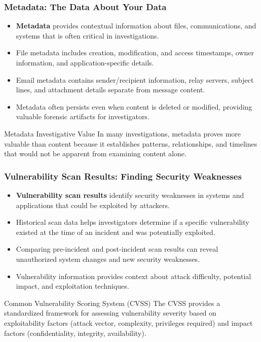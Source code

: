 \documentclass{beamer}
\begin{document}
\begin{frame}
\frametitle{Metadata: The Data About Your Data}
\begin{itemize}
\item \textbf{Metadata} provides contextual information about files, communications, and systems that is often critical in investigations.
\item File metadata includes creation, modification, and access timestamps, owner information, and application-specific details.
\item Email metadata contains sender/recipient information, relay servers, subject lines, and attachment details separate from message content.
\item Metadata often persists even when content is deleted or modified, providing valuable forensic artifacts for investigators.
\end{itemize}

\begin{alertblock}{Metadata Investigative Value}
\scriptsize
In many investigations, metadata proves more valuable than content because it establishes patterns, relationships, and timelines that would not be apparent from examining content alone.
\end{alertblock}
\end{frame}


\begin{frame}
\frametitle{Vulnerability Scan Results: Finding Security Weaknesses}
\begin{itemize}
\item \textbf{Vulnerability scan results} identify security weaknesses in systems and applications that could be exploited by attackers.
\item Historical scan data helps investigators determine if a specific vulnerability existed at the time of an incident and was potentially exploited.
\item Comparing pre-incident and post-incident scan results can reveal unauthorized system changes and new security weaknesses.
\item Vulnerability information provides context about attack difficulty, potential impact, and exploitation techniques.
\end{itemize}

\begin{exampleblock}{Common Vulnerability Scoring System (CVSS)}
\scriptsize
The CVSS provides a standardized framework for assessing vulnerability severity based on exploitability factors (attack vector, complexity, privileges required) and impact factors (confidentiality, integrity, availability).
\end{exampleblock}
\end{frame}
\end{document}
